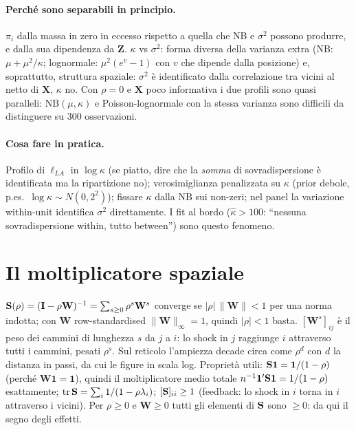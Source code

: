 \documentclass[11pt,a4paper]{article}
\newcommand{\bW}{\mathbf{W}}\newcommand{\bX}{\mathbf{X}}\newcommand{\bZ}{\mathbf{Z}}\newcommand{\by}{\mathbf{y}}
\begin{document}
\paragraph{Perché sono separabili in principio.} $\pi_i$ dalla massa in zero in eccesso rispetto a quella che NB e $\sigma^2$ possono produrre, e dalla sua dipendenza da $\bZ$. $\kappa$ vs $\sigma^2$: forma diversa della varianza extra (NB: $\mu+\mu^2/\kappa$; lognormale: $\mu^2(e^{v}-1)$ con $v$ che dipende dalla posizione) e, soprattutto, struttura spaziale: $\sigma^2$ è identificato dalla correlazione tra vicini al netto di $\bX$, $\kappa$ no. Con $\rho=0$ e $\bX$ poco informativa i due profili sono quasi paralleli: $\mathrm{NB}(\mu,\kappa)$ e Poisson-lognormale con la stessa varianza sono difficili da distinguere su 300 osservazioni.

\paragraph{Cosa fare in pratica.} Profilo di $\ell_{LA}$ in $\log\kappa$ (se piatto, dire che la \emph{somma} di sovradispersione è identificata ma la ripartizione no); verosimiglianza penalizzata su $\kappa$ (prior debole, p.es.\ $\log\kappa\sim N(0,2^2)$); fissare $\kappa$ dalla NB sui non-zeri; nel panel la variazione within-unit identifica $\sigma^2$ direttamente. I fit al bordo ($\hat\kappa>100$: ``nessuna sovradispersione within, tutto between'') sono questo fenomeno.

\section{Il moltiplicatore spaziale}\label{app:multiplier}
$\bS(\rho)=(\bI-\rho\bW)^{-1}=\sum_{s\ge0}\rho^s\bW^s$ converge se $|\rho|\,\|\bW\|<1$ per una norma indotta; con $\bW$ row-standardised $\|\bW\|_\infty=1$, quindi $|\rho|<1$ basta. $[\bW^s]_{ij}$ è il peso dei cammini di lunghezza $s$ da $j$ a $i$: lo shock in $j$ raggiunge $i$ attraverso tutti i cammini, pesati $\rho^s$. Sul reticolo l'ampiezza decade circa come $\rho^{d}$ con $d$ la distanza in passi, da cui le figure in scala log. Proprietà utili: $\mathbf{S}\mathbf1=\mathbf1/(1-\rho)$ (perché $\bW\mathbf1=\mathbf1$), quindi il moltiplicatore medio totale $n^{-1}\mathbf1'\mathbf{S}\mathbf1=1/(1-\rho)$ esattamente; $\operatorname{tr}\mathbf{S}=\sum_i1/(1-\rho\lambda_i)$; $[\mathbf{S}]_{ii}\ge1$ (feedback: lo shock in $i$ torna in $i$ attraverso i vicini). Per $\rho\ge0$ e $\bW\ge0$ tutti gli elementi di $\mathbf{S}$ sono $\ge0$: da qui il segno degli effetti.
\end{document}
